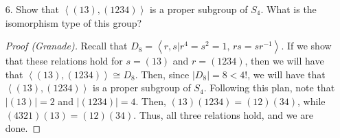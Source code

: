 \documentclass[10pt]{article}
\newcommand{\la}{\langle}
\newcommand{\ra}{\rangle}
\begin{document}
\begin{itemize}
\begin{proof}
Pick an arbitrary $i$ with $1 \leq i \leq n-1$. Then $(1 \, 2 \, \ldots \, n)^{n-i+1}$ gives us:
\begin{equation*}
\left(
\begin{matrix}
1 & 2 & \cdots & i & i+1 & \cdots & n \\
n-i+2 & n-i+3 & \cdots & 1 & 2 & \cdots & n-i+1
\end{matrix}
\right)
\end{equation*}
Composing this with $(1\, 2)$ to this gives us:
\begin{equation*}
\left(
\begin{matrix}
1 & 2 & \cdots & i & i+1 & \cdots & n \\
n-i+2 & n-i+3 & \cdots & 2 & 1 & \cdots & n-i+1
\end{matrix}
\right)
\end{equation*}
Finally, composing this with $(1\, 2\, \cdots \, n)^{i-1}$ gives us:
\begin{equation*}
\left(
\begin{matrix}
1 & 2 & \cdots & i & i+1 & \cdots & n \\
1 & 2 & \cdots & i+1 & i & \cdots & n
\end{matrix}
\right)
\end{equation*}
Therefore, $(i \quad i+1) = (1\, 2\, \cdots\, n)^{i-1}(1\, 2)(1\, 2\, \cdots\, n)^{n-i+1}$. Thus $S_n = \la (1 \, 2), (1 \, 2 \, 3 \ldots n) \ra$. 

\end{proof}

\item [6.] Show that $\left\langle \left(13\right),\left(1234\right)\right\rangle $
is a proper subgroup of $S_{4}$. What is the isomorphism type of
this group?

\begin{proof}[Proof (Granade)]
Recall that $D_{8}=\left\langle r,s|r^{4}=s^{2}=1,\, rs=sr^{-1}\right\rangle $.
If we show that these relations hold for $s=\left(13\right)$ and
$r=\left(1234\right)$, then we will have that $\left\langle \left(13\right),\left(1234\right)\right\rangle \cong D_{8}$.
Then, since $\left|D_{8}\right|=8<4!$, we will have that $\left\langle \left(13\right),\left(1234\right)\right\rangle $
is a proper subgroup of $S_{4}$. Following this plan, note that $\left|\left(13\right)\right|=2$
and $\left|\left(1234\right)\right|=4$. Then, $\left(13\right)\left(1234\right)=\left(12\right)\left(34\right)$,
while $\left(4321\right)\left(13\right)=\left(12\right)\left(34\right)$.
Thus, all three relations hold, and we are done.
\end{proof}


\end{itemize}
\end{document}
